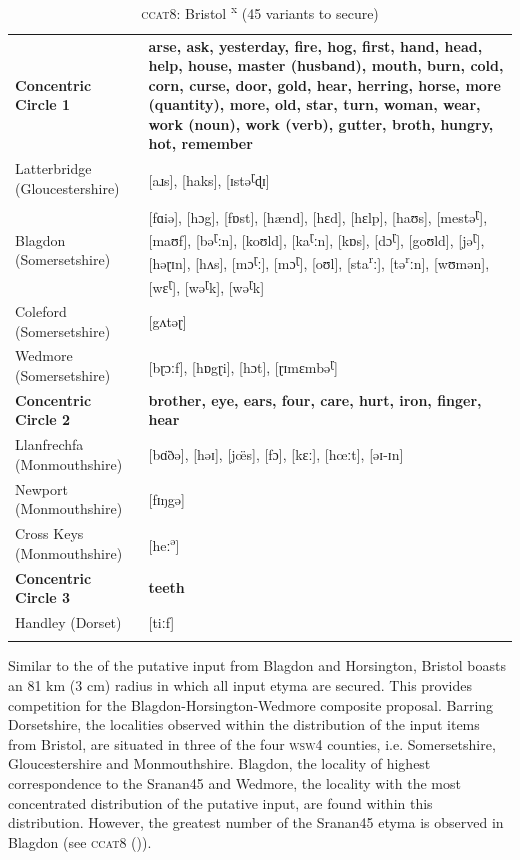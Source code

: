 \begin{table}
\begin{tabularx}{\textwidth}{lQ}
\lsptoprule 
\textbf{Concentric Circle 1} & \textbf{arse, ask, yesterday, fire, hog, first, hand, head, help, house, master (husband), mouth, burn, cold, corn, curse, door, gold, hear, herring, horse, more (quantity), more, old, star, turn, woman, wear, work (noun), work (verb), gutter, broth, hungry, hot, remember} \\  
Latterbridge (Gloucestershire) &  [aɹs], [haks], [ɪstə\textsuperscript{ɽ}ɖɪ]\\
Blagdon (Somersetshire)        &  [fɑiə], [hɔg], [fɒst], [hænd], [hɛd], [hɛlp], [haʊs], [mestə\textsuperscript{ɽ}], [maʊf],
                                  [bə\textsuperscript{ɽ}ːn], [koʊld], [ka\textsuperscript{ɽ}ːn], [kɒs], [dɔ\textsuperscript{ɽ}], [goʊld],
                                  [jə\textsuperscript{ɽ}], [hə{ɽ}ɪn],  [hʌs], [mɔ\textsuperscript{ɽ}ː], [mɔ\textsuperscript{ɽ}], [oʊl],
                                  [sta\textsuperscript{r}ː], [tə\textsuperscript{r}ːn], [wʊmən],[wɛ\textsuperscript{ɽ}], [wə\textsuperscript{ɽ}k], 
                                  [wə\textsuperscript{ɽ}k]\\
Coleford (Somersetshire)        & [gʌtəɽ]\\
Wedmore (Somersetshire)         & [bɽɔːf], [hɒgɽi], [hɔt], [ɽɪmɛmbə\textsuperscript{ɽ}]  \\
\textbf{Concentric Circle 2}    & \textbf{brother, eye, ears, four, care, hurt, iron, finger, hear}\\
Llanfrechfa (Monmouthshire)     & [b\"ɑðə], [həɪ], [j\"œs], [fɔ], [kɛː], [hœːt], [əɪ-ɪn]   \\
Newport (Monmouthshire)         & [fɪŋgə] \\
Cross Keys (Monmouthshire)      & [heː\textsuperscript{ə}]\\
\textbf{Concentric Circle 3}    & \textbf{teeth}\\ 
Handley (Dorset)                & [tiːf] \\
\lspbottomrule 
\end{tabularx}
\caption{\textsc{ccat8}: Bristol \textsuperscript{x} (45 variants to secure)}
\label{Table 5.9}
\end{table}

Similar to the  of the putative input from Blagdon and Horsington, Bristol boasts an 81 km (3 cm) radius in which all input etyma are secured. This provides competition for the Blagdon-Horsington-Wedmore composite  proposal. Barring Dorsetshire, the localities observed within the distribution of the input items from Bristol, are situated in three of the four \textsc{wsw4} counties, i.e. Somersetshire, Gloucestershire and Monmouthshire. Blagdon, the locality of highest correspondence to the Sranan45 and Wedmore, the locality with the most concentrated distribution of the putative input, are found within this distribution. However, the greatest number of the Sranan45  etyma is observed in Blagdon (see \textsc{ccat8} ()).

